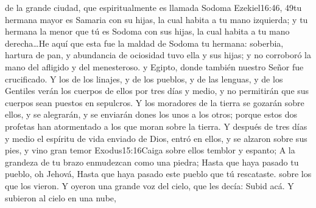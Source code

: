  de la grande ciudad,%
 que espiritualmente es llamada Sodoma%
				   {Ezekiel}{16:46, 49}{tu hermana mayor es Samaria con su hijas, la cual habita a tu mano izquierda; y tu hermana la menor que tú es Sodoma con sus hijas, la cual habita a tu mano derecha\ldots He aquí que esta fue la maldad de Sodoma tu hermana: soberbia, hartura de pan, y abundancia de ociosidad tuvo ella y sus hijas; y no corroboró la mano del afligido y del menesteroso.}
 y Egipto,%
 donde también nuestro Señor fue crucificado.
Y los de los linajes, y de los pueblos, y de las lenguas, y de los Gentiles verán los cuerpos de ellos por tres días y medio, y no permitirán que sus cuerpos sean puestos en sepulcros. 
Y los moradores de la tierra se gozarán sobre ellos, y se alegrarán, y se enviarán dones los unos a los otros; porque estos dos profetas han atormentado a los que moran sobre la tierra.%
Y después de tres días y medio el espíritu de vida enviado de Dios, entró en ellos,%
 y se alzaron sobre sus pies,%
 y vino gran temor%
				  {Exodus}{15:16}{Caiga sobre ellos temblor y espanto; A la grandeza de tu brazo enmudezcan como una piedra; Hasta que haya pasado tu pueblo, oh Jehová, Hasta que haya pasado este pueblo que tú rescataste.} %
 sobre los que los vieron. 
Y oyeron una grande voz del cielo, que les decía: Subid acá. Y subieron al cielo en una nube,%
